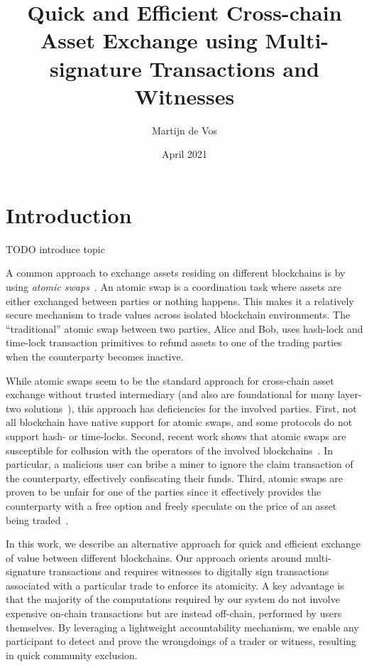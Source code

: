 \documentclass{article}
\title{Quick and Efficient Cross-chain Asset Exchange using Multi-signature Transactions and Witnesses}
\author{Martijn de Vos}
\date{April 2021}
\begin{document}
\maketitle

\section{Introduction}
TODO introduce topic

A common approach to exchange assets residing on different blockchains is by using \emph{atomic swaps}~\cite{herlihy2018atomic}.
An atomic swap is a coordination task where assets are either exchanged between parties or nothing happens.
This makes it a relatively secure mechanism to trade values across isolated blockchain environments.
The \enquote{traditional} atomic swap between two parties, Alice and Bob, uses hash-lock and time-lock transaction primitives to refund assets to one of the trading parties when the counterparty becomes inactive.

While atomic swaps seem to be the standard approach for cross-chain asset exchange without trusted intermediary (and also are foundational for many layer-two solutions~\cite{gudgeon2019sok}), this approach has deficiencies for the involved parties.
First, not all blockchain have native support for atomic swaps, and some protocols do not support hash- or time-locks.
Second, recent work shows that atomic swaps are susceptible for collusion with the operators of the involved blockchains~\cite{tsabary2020mad}.
In particular, a malicious user can bribe a miner to ignore the claim transaction of the counterparty, effectively confiscating their funds.
Third, atomic swaps are proven to be unfair for one of the parties since it effectively provides the counterparty with a free option and freely speculate on the price of an asset being traded~\cite{han2019optionality}.

In this work, we describe an alternative approach for quick and efficient exchange of value between different blockchains.
Our approach orients around multi-signature transactions and requires witnesses to digitally sign transactions associated with a particular trade to enforce its atomicity.
A key advantage is that the majority of the computations required by our system do not involve expensive on-chain transactions but are instead off-chain, performed by users themselves.
By leveraging a lightweight accountability mechanism, we enable any participant to detect and prove the wrongdoings of a trader or witness, resulting in quick community exclusion.
\end{document}
